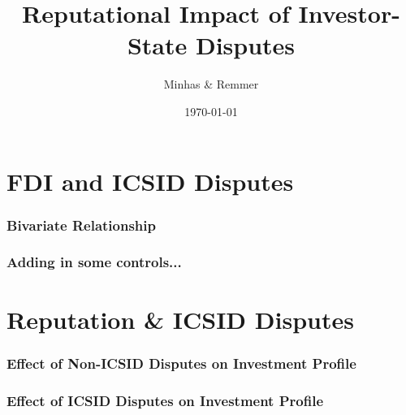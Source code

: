 \documentclass[10pt]{beamer}
\title[Contingent Institutions \hspace{14em} \insertframenumber/
\inserttotalframenumber]{Reputational Impact of Investor-State Disputes}
\author{Minhas \& Remmer}
\institute[Duke University]
{
{\emph{sfm12@duke.edu}} \\
\medskip
Duke University 
}
\date{\today}
\begin{document}
\begin{frame}
\titlepage
\end{frame}

\section{FDI and ICSID Disputes}

\begin{frame}
\frametitle{Bivariate Relationship}

\begin{figure}[ht]
	\centering
	\resizebox{1\textwidth}{!}{}	
\end{figure}

\end{frame}

\begin{frame}
\frametitle{Adding in some controls...}

\begin{figure}[ht]
	\centering
	\vspace{-5mm}
	\resizebox{1\textwidth}{!}{}	
\end{figure}

\end{frame}

\section{Reputation \& ICSID Disputes}

\begin{frame}
\frametitle{Effect of Non-ICSID Disputes on Investment Profile}

\begin{figure}[ht]
	\centering
	\vspace{-5mm}	
	\resizebox{1\textwidth}{!}{}	
\end{figure}

\end{frame}

\begin{frame}
\frametitle{Effect of ICSID Disputes on Investment Profile}

\begin{figure}[ht]
	\centering
	\vspace{-5mm}	
	\resizebox{1\textwidth}{!}{}
\end{figure}

\end{frame}
\end{document}

